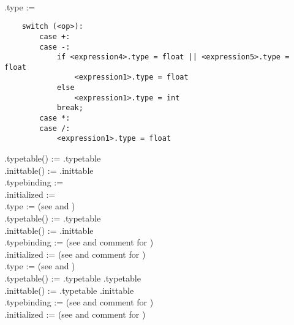 \documentclass{article}
\begin{document}
\begin{enumerate}
{\it {} \rarrow {}  } \\
.type := \begin{lstlisting}
    switch (<op>):
        case +:
        case -:
            if <expression4>.type = float || <expression5>.type = float
                <expression1>.type = float
            else 
                <expression1>.type = int
            break;
        case *:
        case /:
            <expression1>.type = float
    \end{lstlisting}
.typetable() := .typetable\\
.inittable() := .inittable\\
.typebinding := \na\\
.initialized := \na\\

.type := (see  and )\\
.typetable() := .typetable\\
.inittable() := .inittable\\
.typebinding := (see  and comment for )\\
.initialized := (see  and comment for )\\

.type := (see  and )\\
.typetable() := .typetable \union {}.typetable\\
.inittable() := .typetable \union {}.inittable\\
.typebinding := (see  and comment for )\\
.initialized := (see  and comment for )\\


\end{enumerate}
\end{document}
